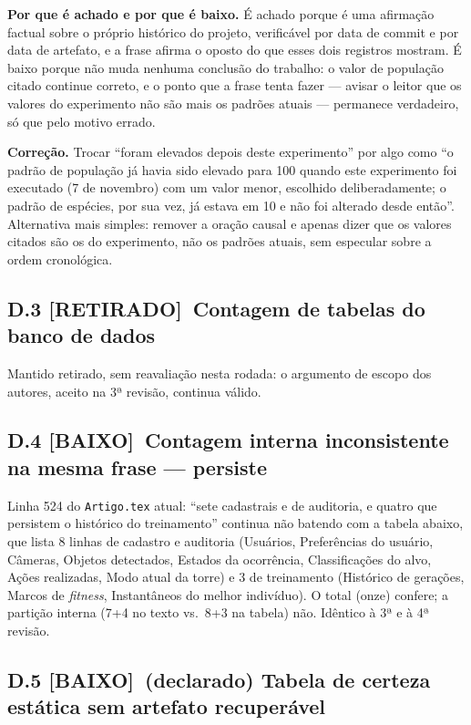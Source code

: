 \documentclass[11pt,a4paper]{article}
\newcommand{\baixo}{\textbf{\color{gray}[BAIXO]}}
\newcommand{\retirado}{\textbf{[RETIRADO]}}
\begin{document}
\textbf{Por que é achado e por que é baixo.} É achado porque é uma afirmação factual sobre o próprio
histórico do projeto, verificável por data de commit e por data de artefato, e a frase afirma o
oposto do que esses dois registros mostram. É baixo porque não muda nenhuma conclusão do trabalho: o
valor de população citado continue correto, e o ponto que a frase tenta fazer --- avisar o leitor que
os valores do experimento não são mais os padrões atuais --- permanece verdadeiro, só que pelo motivo
errado.

\textbf{Correção.} Trocar ``foram elevados depois deste experimento'' por algo como ``o padrão de
população já havia sido elevado para 100 quando este experimento foi executado (7 de novembro) com um
valor menor, escolhido deliberadamente; o padrão de espécies, por sua vez, já estava em 10 e não foi
alterado desde então''. Alternativa mais simples: remover a oração causal e apenas dizer que os valores
citados são os do experimento, não os padrões atuais, sem especular sobre a ordem cronológica.

\subsection*{D.3 \retirado\ Contagem de tabelas do banco de dados}

Mantido retirado, sem reavaliação nesta rodada: o argumento de escopo dos autores, aceito na 3ª
revisão, continua válido.

\subsection*{D.4 \baixo\ Contagem interna inconsistente na mesma frase --- persiste}

Linha 524 do \texttt{Artigo.tex} atual: ``sete cadastrais e de auditoria, e quatro que persistem o
histórico do treinamento'' continua não batendo com a tabela abaixo, que lista 8 linhas de cadastro e
auditoria (Usuários, Preferências do usuário, Câmeras, Objetos detectados, Estados da ocorrência,
Classificações do alvo, Ações realizadas, Modo atual da torre) e 3 de treinamento (Histórico de
gerações, Marcos de \textit{fitness}, Instantâneos do melhor indivíduo). O total (onze) confere; a
partição interna (7+4 no texto vs.\ 8+3 na tabela) não. Idêntico à 3ª e à 4ª revisão.

\subsection*{D.5 \baixo\ (declarado) Tabela de certeza estática sem artefato recuperável}
\end{document}
